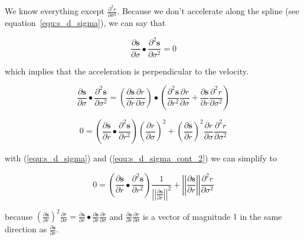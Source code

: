\documentclass[11pt,onecolumn,a4paper,oneside,openright,final]{article}
\begin{document}
We know everything except $\frac{\partial^2 r}{\partial \sigma^2}$. Because we don't accelerate along the spline (see equation~\ref{equ:s_d_sigma}), we can say that

\begin{equation}
    \frac{\partial \mathbf{s}}{\partial \sigma} \bullet \frac{\partial^2 \mathbf{s}}{\partial \sigma^2} = 0
    \label{equ:perpendicular}
\end{equation}

which implies that the acceleration is perpendicular to the velocity.

\begin{equation}
    \frac{\partial \mathbf{s}}{\partial \sigma} \bullet \frac{\partial^2 \mathbf{s}}{\partial \sigma^2} =
    \left(
    \frac{\partial \mathbf{s}}{\partial r} \frac{\partial r}{\partial \sigma}
    \right) \bullet \left(
    \frac{\partial^2 \mathbf{s}}{\partial r^2} \frac{\partial r}{\partial \sigma} +
    \frac{\partial \mathbf{s}}{\partial r} \frac{\partial^2 r}{\partial \sigma^2} 
    \right)
    \label{equ:perpendicular_1}
\end{equation}

\begin{equation}
    0 =
    \left( \frac{\partial \mathbf{s}}{\partial r} \bullet \frac{\partial^2 \mathbf{s}}{\partial r^2} \right) {\left( \frac{\partial r}{\partial \sigma} \right)}^2
    + {\left( \frac{\partial \mathbf{s}}{\partial r} \right)}^2 \frac{\partial r}{\partial \sigma} \frac{\partial^2 r}{\partial \sigma^2}
    \label{equ:perpendicular_2}
\end{equation}

with (\ref{equ:s_d_sigma}) and (\ref{equ:s_d_sigma_cont_2}) we can simplify to

\begin{equation}
    0 =
    \left( \frac{\partial \mathbf{s}}{\partial r} \bullet \frac{\partial^2 \mathbf{s}}{\partial r^2} \right)
    \frac{1}{{\left| \left| \frac{\partial \mathbf{s}}{\partial r} \right| \right|}^2}
    + {\left| \left| \frac{\partial \mathbf{s}}{\partial r} \right| \right|} \frac{\partial^2 r}{\partial \sigma^2}
    \label{equ:perpendicular_3}
\end{equation}

because ${\left( \frac{\partial \mathbf{s}}{\partial r} \right)}^2 \frac{\partial r}{\partial \sigma}  = \frac{\partial \mathbf{s}}{\partial r} \bullet \frac{\partial \mathbf{s}}{\partial r} \frac{\partial r}{\partial \sigma}$
and $\frac{\partial \mathbf{s}}{\partial r} \frac{\partial r}{\partial \sigma}$ is a vector of magnitude $1$ in the same direction as $\frac{\partial \mathbf{s}}{\partial r}$.
\end{document}
